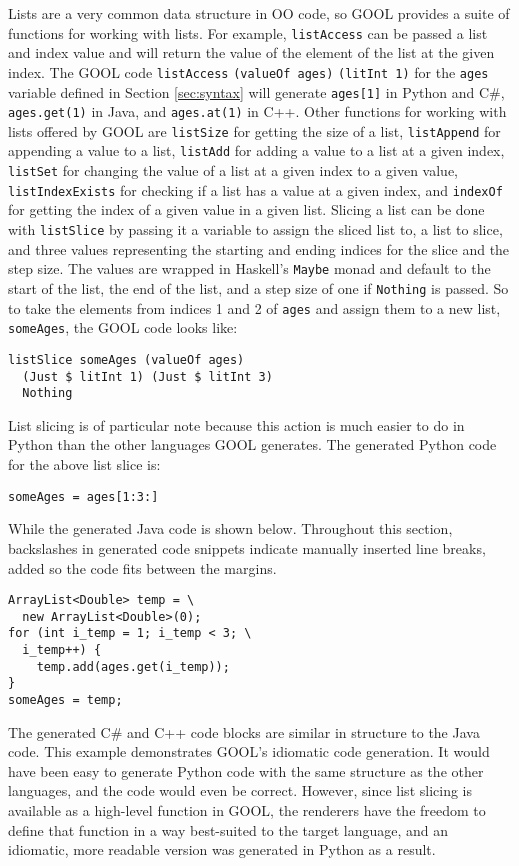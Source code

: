 \documentclass[sigplan,review,anonymous,prologue,dvipsnames]{acmart}
\begin{document}
Lists are a very common data structure in OO code, so GOOL provides a suite of 
functions for working with lists. For example, \verb|listAccess| can be passed 
a list and index value and will return the value of the element of the list at 
the given index. The GOOL code \verb|listAccess| \verb|(valueOf ages)| 
\verb|(litInt 1)| for the \verb|ages| variable defined in Section \ref{sec:syntax} 
will generate \verb|ages[1]| in Python and C\#, \verb|ages.get(1)| in Java, and 
\verb|ages.at(1)| in C++. Other functions for working with lists offered by 
GOOL are \verb|listSize| for getting the size of a list, \verb|listAppend| for 
appending a value to a list, \verb|listAdd| for adding a value to a list at a 
given index, \verb|listSet| for changing the value of a list at a given 
index to a given value, \verb|listIndexExists| for checking if a list has a 
value at a given index, and \verb|indexOf| for getting the index of a given 
value in a given list. Slicing a list can be done with \verb|listSlice| by 
passing it a variable to assign the sliced list to, a list to slice, and three 
values representing the starting and ending indices for the slice and the step 
size. The values are wrapped in Haskell's \verb|Maybe| monad and default to the 
start of the list, the end of the list, and a step size of one if 
\verb|Nothing| is passed. So to take the elements from indices 1 and 2 of 
\verb|ages| and assign them to a new list, \verb|someAges|, the GOOL code looks 
like:
\begin{lstlisting}
listSlice someAges (valueOf ages) 
  (Just $ litInt 1) (Just $ litInt 3) 
  Nothing
\end{lstlisting} 
List slicing is of particular note because this action is much easier to do in 
Python than the other languages GOOL generates. The generated Python code for 
the above list slice is:
\begin{lstlisting}
someAges = ages[1:3:]
\end{lstlisting}
While the generated Java code is shown below. Throughout this section, 
backslashes in generated code snippets indicate manually inserted line breaks, 
added so the code fits between the margins.
\begin{lstlisting}
ArrayList<Double> temp = \
  new ArrayList<Double>(0);
for (int i_temp = 1; i_temp < 3; \
  i_temp++) {
    temp.add(ages.get(i_temp));
}
someAges = temp;
\end{lstlisting}
The generated C\# and C++ code blocks are similar in structure to the Java 
code. This example demonstrates GOOL's idiomatic code generation. It would have 
been easy to generate Python code with the same structure as the other 
languages, and the code would even be correct. However, since list slicing is 
available as a high-level function in GOOL, the renderers have the freedom to 
define that function in a way best-suited to the target language, and an 
idiomatic, more readable version was generated in Python as a result.
\end{document}
